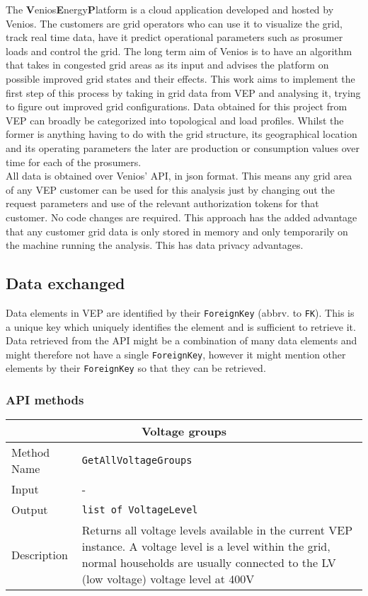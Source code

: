 The \textbf{V}enios\textbf{E}nergy\textbf{P}latform is a cloud application
developed and hosted by Venios. The customers are grid operators who can use
it to visualize the grid, track real time data, have it predict 
operational parameters such as prosumer loads and control the grid.
The long term aim of Venios is to have an algorithm that takes in
congested grid areas as its input and advises the platform on possible improved
grid states and their effects. This work aims to implement the first step of this
process by taking in grid data from VEP and analysing it, trying to figure out
improved grid configurations. Data obtained for this project from VEP can broadly
be categorized
into topological and load profiles. Whilst the former is anything having to do with
the grid structure, its geographical location and its operating parameters the later
are production or consumption values over time for each of the prosumers.\\
All data is obtained over Venios' API, in json format. This means any
grid area of any VEP customer can be used for this analysis just by changing out
the request parameters and use of the relevant authorization tokens for that customer.
No code changes are required. This approach has the added advantage that any customer grid
data is only stored in memory and only temporarily on the machine running the analysis. This
has data privacy advantages.

\subsection{Data exchanged}

Data elements in VEP are identified by their \texttt{ForeignKey} (abbrv. to \texttt{FK}). This is a unique key which
uniquely identifies the element and is sufficient to retrieve it. Data retrieved from the API might
be a combination of many data elements and might therefore not have a single \texttt{ForeignKey}, however
it might mention other elements by their \texttt{ForeignKey} so that they can be retrieved.

\subsubsection{API methods}

\begin{tabular}{ l  p{12cm}} 
    \hline
    \multicolumn{2}{c}{\textbf{Voltage groups}}\\
    \hline
    Method Name     & \texttt{GetAllVoltageGroups} \\
    Input           & -\\
    Output          & \texttt{list of VoltageLevel} \\
    Description     & Returns all voltage levels available in the current VEP instance. A voltage level is a level within the grid, normal households are usually connected to the LV (low voltage) voltage level at 400V\\
\end{tabular}

